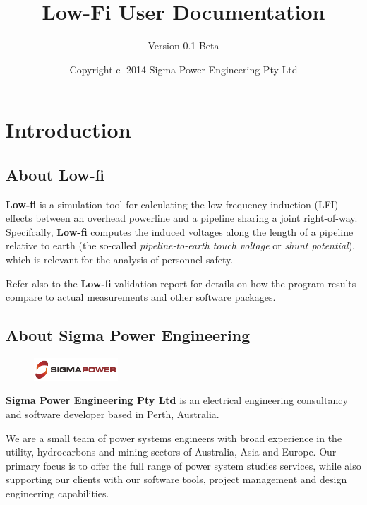 \documentclass{article}
\title{Low-Fi User Documentation}
\author{Version 0.1 Beta}
\date{Copyright \textcircled{c}  2014 Sigma Power Engineering Pty Ltd}
\begin{document}
\pagestyle{plain}
\maketitle

\tableofcontents
\clearpage

\section{Introduction}
\subsection{About Low-fi}
\textbf{Low-fi} is a simulation tool for calculating the low frequency induction (LFI) effects between an overhead powerline and a pipeline sharing a joint right-of-way. Specifcally, \textbf{Low-fi} computes the induced voltages along the length of a pipeline relative to earth (the so-called \emph{pipeline-to-earth touch voltage} or \emph{shunt potential}), which is relevant for the analysis of personnel safety.

Refer also to the \textbf{Low-fi} validation report for details on how the program results compare to actual measurements and other software packages.

\subsection{About Sigma Power Engineering}
\begin{figure}[!ht]
    \includegraphics[width=0.28\textwidth]{./Figures/Sigma_Power.png}
\end{figure}


\textbf{Sigma Power Engineering Pty Ltd} is an electrical engineering consultancy and software developer based in Perth, Australia.

We are a small team of power systems engineers with broad experience in the utility, hydrocarbons and mining sectors of Australia, Asia and Europe. Our primary focus is to offer the full range of power system studies services, while also supporting our clients with our software tools, project management and design engineering capabilities.
\end{document}
